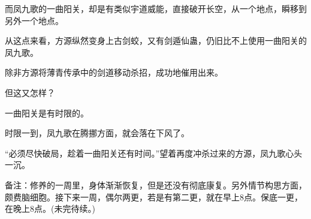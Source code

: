 \begin{this_body}
而凤九歌的一曲阳关，却是有类似宇道威能，直接破开长空，从一个地点，瞬移到另外一个地点。

从这点来看，方源纵然变身上古剑蛟，又有剑遁仙蛊，仍旧比不上使用一曲阳关的凤九歌。

除非方源将薄青传承中的剑道移动杀招，成功地催用出来。

但这又怎样？

一曲阳关是有时限的。

时限一到，凤九歌在腾挪方面，就会落在下风了。

“必须尽快破局，趁着一曲阳关还有时间。”望着再度冲杀过来的方源，凤九歌心头一沉。

备注：修养的一周里，身体渐渐恢复，但是还没有彻底康复。另外情节构思方面，颇费脑细胞。接下来一周，偶尔两更，若是有第二更，就在早上8点。保底一更，在晚上8点。(未完待续。)

\end{this_body}

